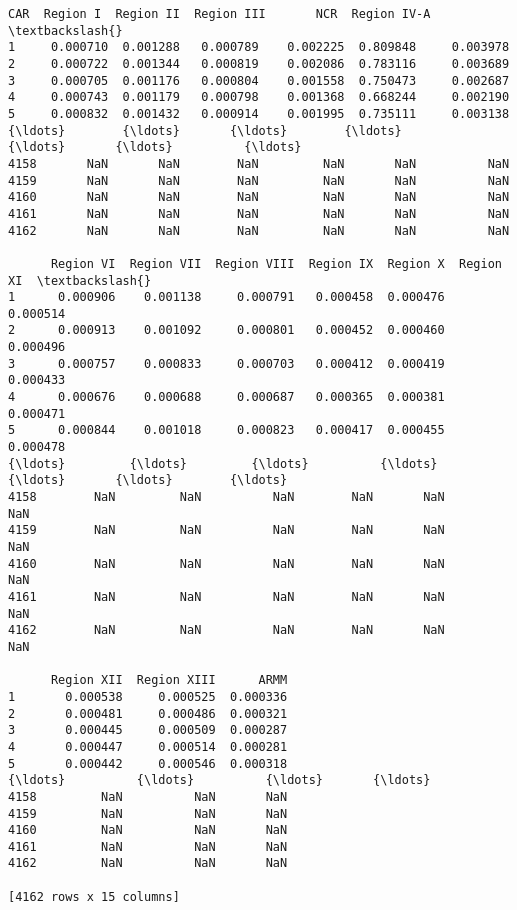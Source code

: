 \documentclass[11pt]{article}
\makeatletter
\newcommand{\boxspacing}{\kern\kvtcb@left@rule\kern\kvtcb@boxsep}
\newcommand{\prompt}[4]{
        {\ttfamily\llap{{\color{#2}[#3]:\hspace{3pt}#4}}\vspace{-\baselineskip}}
    }
\makeatother
\begin{document}
            \begin{tcolorbox}[breakable, size=fbox, boxrule=.5pt, pad at break*=1mm, opacityfill=0]
\prompt{Out}{outcolor}{18}{\boxspacing}
\begin{Verbatim}[commandchars=\\\{\}]
           CAR  Region I  Region II  Region III       NCR  Region IV-A  \textbackslash{}
1     0.000710  0.001288   0.000789    0.002225  0.809848     0.003978
2     0.000722  0.001344   0.000819    0.002086  0.783116     0.003689
3     0.000705  0.001176   0.000804    0.001558  0.750473     0.002687
4     0.000743  0.001179   0.000798    0.001368  0.668244     0.002190
5     0.000832  0.001432   0.000914    0.001995  0.735111     0.003138
{\ldots}        {\ldots}       {\ldots}        {\ldots}         {\ldots}       {\ldots}          {\ldots}
4158       NaN       NaN        NaN         NaN       NaN          NaN
4159       NaN       NaN        NaN         NaN       NaN          NaN
4160       NaN       NaN        NaN         NaN       NaN          NaN
4161       NaN       NaN        NaN         NaN       NaN          NaN
4162       NaN       NaN        NaN         NaN       NaN          NaN

      Region VI  Region VII  Region VIII  Region IX  Region X  Region XI  \textbackslash{}
1      0.000906    0.001138     0.000791   0.000458  0.000476   0.000514
2      0.000913    0.001092     0.000801   0.000452  0.000460   0.000496
3      0.000757    0.000833     0.000703   0.000412  0.000419   0.000433
4      0.000676    0.000688     0.000687   0.000365  0.000381   0.000471
5      0.000844    0.001018     0.000823   0.000417  0.000455   0.000478
{\ldots}         {\ldots}         {\ldots}          {\ldots}        {\ldots}       {\ldots}        {\ldots}
4158        NaN         NaN          NaN        NaN       NaN        NaN
4159        NaN         NaN          NaN        NaN       NaN        NaN
4160        NaN         NaN          NaN        NaN       NaN        NaN
4161        NaN         NaN          NaN        NaN       NaN        NaN
4162        NaN         NaN          NaN        NaN       NaN        NaN

      Region XII  Region XIII      ARMM
1       0.000538     0.000525  0.000336
2       0.000481     0.000486  0.000321
3       0.000445     0.000509  0.000287
4       0.000447     0.000514  0.000281
5       0.000442     0.000546  0.000318
{\ldots}          {\ldots}          {\ldots}       {\ldots}
4158         NaN          NaN       NaN
4159         NaN          NaN       NaN
4160         NaN          NaN       NaN
4161         NaN          NaN       NaN
4162         NaN          NaN       NaN

[4162 rows x 15 columns]
\end{Verbatim}
\end{tcolorbox}
        
\end{document}
